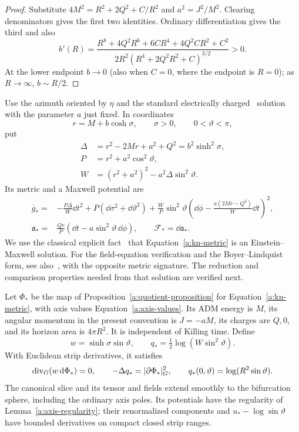 \begin{proof}
Substitute $4M^2=R^2+2Q^2+C/R^2$ and $a^2=J^2/M^2$.
Clearing denominators gives the first two identities.  Ordinary
differentiation gives the third and also
\[
 b'(R)=
 \frac{R^8+4Q^2R^6+6CR^4+4Q^2CR^2+C^2}
 {2R^2(R^4+2Q^2R^2+C)^{3/2}}>0.
\]
At the lower endpoint $b\to0$ (also when $C=0$, where the
endpoint is $R=0$); as $R\to\infty$, $b\sim R/2$.
\end{proof}

Use the azimuth oriented by $\eta$ and the standard electrically
charged \KN\ solution with the parameter $a$ just fixed.  In
coordinates
\[
 r=M+b\cosh\sigma,\qquad \sigma>0,\qquad0<\vartheta<\pi,
\]
put
\begin{align*}
 \Delta&=r^2-2Mr+a^2+Q^2=b^2\sinh^2\sigma,\\
 P&=r^2+a^2\cos^2\vartheta,\\
 W&=(r^2+a^2)^2-a^2\Delta\sin^2\vartheta.
\end{align*}
Its metric and a Maxwell potential are
\begin{equation}\label{a:kn-metric}
 \begin{split}
 \overline g_*={}&-\frac{P\Delta}{W}\dd t^2
       +P(\dd\sigma^2+\dd\vartheta^2)
       +\frac WP\sin^2\vartheta
            \left(\dd\phi-\frac{a(2Mr-Q^2)}W\dd t\right)^2,\\
 \mathfrak a_*={}&\frac{Qr}{P}
                  (\dd t-a\sin^2\vartheta\,\dd\phi),
 \qquad \mathcal F_*=\dd\mathfrak a_*.
 \end{split}
\end{equation}
We use the classical explicit fact~\cite{NewmanEtAl1965} that
Equation~\eqref{a:kn-metric} is an Einstein--Maxwell solution.
For the field-equation verification and the Boyer--Lindquist form,
see also~\cite[Section~2.2 and Equation~(3.2)]{AdamoNewman2014},
with the opposite metric signature.
The reduction and comparison properties needed from that solution
are verified next.

\begin{proposition}\label{a:model}
Let $\Phi_*$ be the map of
Proposition~\ref{a:quotient-proposition} for
Equation~\eqref{a:kn-metric}, with axis values
Equation~\eqref{a:axis-values}.  Its ADM energy is $M$, its
angular momentum in the present convention is $J=-aM$, its
charges are $Q,0$, and its horizon area is $4\pi R^2$.
It is independent of Killing time.  Define
\[
 w=\sinh\sigma\sin\vartheta,
 \qquad q_* =\tfrac12\log(W\sin^2\vartheta).
\]
With Euclidean strip derivatives, it satisfies
\begin{equation}\label{a:model-map}
 \operatorname{div}_G(w\,\mathrm d\Phi_*)=0,\qquad
 -\Delta q_*=|\partial\Phi_*|_G^2,
 \qquad q_*(0,\vartheta)=\log(R^2\sin\vartheta).
\end{equation}
The canonical slice and its tensor and fields extend smoothly
to the bifurcation sphere, including the ordinary axis poles.
Its potentials have the regularity of
Lemma~\ref{a:axis-regularity}; their renormalized components and
$u_*-\log\sin\vartheta$ have bounded derivatives on compact
closed strip ranges.
\end{proposition}

